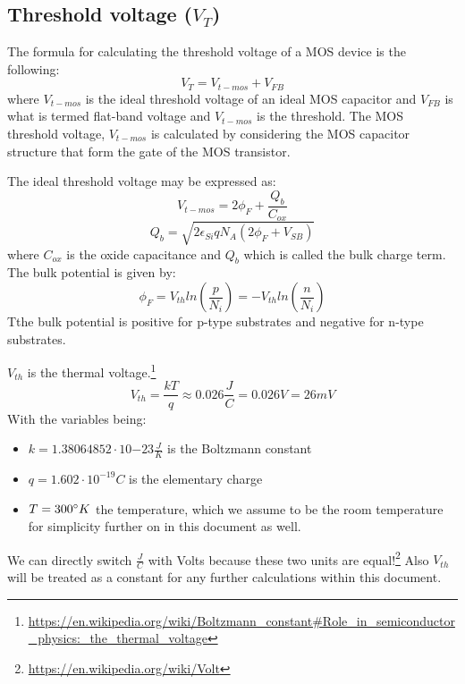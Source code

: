 \subsection{Threshold voltage ($V_T$)}\label{transistor_threshold_calculation}
The formula for calculating the threshold voltage of a MOS device is the following:
\begin{equation}
V_T = V_{t-mos} + V_{FB}
\end{equation}
where $V_{t-mos}$ is the ideal threshold voltage of an ideal MOS capacitor and $V_{FB}$ is what is termed flat-band voltage and $V_{t-mos}$ is the threshold.
The MOS threshold voltage, $V_{t-mos}$ is calculated by considering the MOS capacitor structure that form the gate of the MOS transistor.

The ideal threshold voltage may be expressed as:
\begin{equation}
V_{t-mos}=2 \phi_F + \frac{Q_b}{C_{ox}}
\end{equation}
\begin{equation}
Q_b
=
\sqrt{2 \epsilon_{Si} q N_A ( 2 \phi_F + V_{SB}) }
\end{equation}
where $C_{ox}$ is the oxide capacitance and $Q_b$ which is called the bulk charge term.\\

The bulk potential is given by:
\begin{equation}
\phi_F
=
V_{th} ln\left(\frac{p}{N_i}\right)
=
-V_{th} ln\left(\frac{n}{N_i}\right)
\end{equation}
Tthe bulk potential is positive for p-type substrates and negative for n-type substrates.

$V_{th}$ is the thermal voltage.\footnote{\url{https://en.wikipedia.org/wiki/Boltzmann_constant\#Role_in_semiconductor_physics:_the_thermal_voltage}}
\begin{equation}
V_{th} = \frac{k T}{q} \approx 0.026 \frac{J}{C} = 0.026 V = 26mV
\end{equation}
With the variables being:
\begin{itemize}
\item $k=1.38064852\cdot 10{-23}  \frac{J}{K}$ is the Boltzmann constant
\item $q=1.602 \cdot 10^{-19} C$ is the elementary charge
\item $T= 300 \degree K$ the temperature, which we assume to be the room temperature for simplicity further on in this document as well.
\end{itemize}
We can directly switch $\frac{J}{C}$ with Volts because these two units are equal!\footnote{\url{https://en.wikipedia.org/wiki/Volt}}
Also $V_{th}$ will be treated as a constant for any further calculations within this document.

